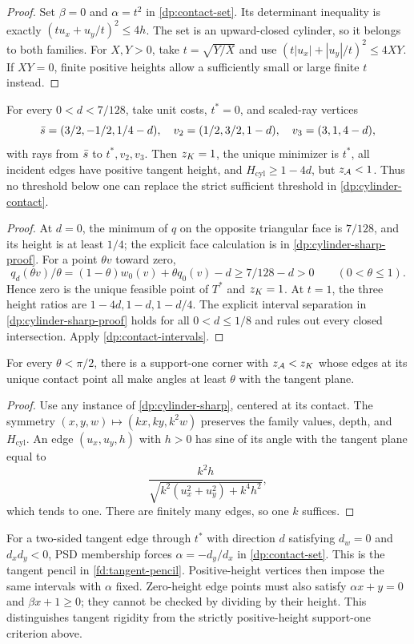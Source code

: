 \begin{proof}
Set $\beta=0$ and $\alpha=t^2$ in \cref{dp:contact-set}.
Its determinant inequality is exactly
$(tu_x+u_y/t)^2\le4h$. The set is an upward-closed cylinder, so it
belongs to both families. For $X,Y>0$, take $t=\sqrt{Y/X}$ and use
$(t|u_x|+|u_y|/t)^2\le4XY$. If $XY=0$, finite positive heights allow
a sufficiently small or large finite $t$ instead.
\end{proof}

\begin{proposition}\label{dp:cylinder-sharp}
For every $0<d<7/128$, take unit costs, $t^*=0$, and scaled-ray vertices
\[
 \bar s=(3/2,-1/2,1/4-d),\quad
 v_2=(1/2,3/2,1-d),\quad v_3=(3,1,4-d),
\]
with rays from $\bar s$ to $t^*,v_2,v_3$. Then $z_K=1$, the unique
minimizer is $t^*$, all incident edges have positive tangent height, and
$H_{\mathrm{cyl}}\ge1-4d$, but $z_{\mathcal A}<1$.
Thus no threshold below one can replace the strict sufficient threshold in
\cref{dp:cylinder-contact}.
\end{proposition}

\begin{proof}
At $d=0$, the minimum of $q$ on the opposite triangular face is $7/128$,
and its height is at least $1/4$; the explicit face calculation is in
\cref{dp:cylinder-sharp-proof}. For a point $\theta v$ toward zero,
\[
 q_d(\theta v)/\theta=(1-\theta)w_0(v)+\theta q_0(v)-d
 \ge7/128-d>0\qquad(0<\theta\le1).
\]
Hence zero is the unique feasible point of $T^*$ and $z_K=1$.
At $t=1$, the three height ratios are $1-4d,1-d,1-d/4$.
The explicit interval separation in \cref{dp:cylinder-sharp-proof}
holds for all $0<d\le1/8$ and rules out every closed intersection.
Apply \cref{dp:contact-intervals}.
\end{proof}

\begin{proposition}\label{dp:angles}
For every $\theta<\pi/2$, there is a support-one corner with $z_{\mathcal A}<z_K$ whose
edges at its unique contact point all make angles at least $\theta$ with
the tangent plane.
\end{proposition}

\begin{proof}
Use any instance of \cref{dp:cylinder-sharp}, centered at its contact.
The symmetry $(x,y,w)\mapsto(kx,ky,k^2w)$ preserves the family values,
depth, and $H_{\mathrm{cyl}}$. An edge $(u_x,u_y,h)$ with $h>0$ has sine
of its angle with the tangent plane equal to
\[
 \frac{k^2h}{\sqrt{k^2(u_x^2+u_y^2)+k^4h^2}},
\]
which tends to one. There are finitely many edges, so one $k$ suffices.
\end{proof}

For a two-sided tangent edge through $t^*$ with direction $d$ satisfying
$d_w=0$ and $d_xd_y<0$, PSD membership forces
$\alpha=-d_y/d_x$ in \cref{dp:contact-set}. This is the tangent pencil
in \cref{fd:tangent-pencil}. Positive-height vertices then impose the
same intervals with $\alpha$ fixed. Zero-height edge points must also
satisfy $\alpha x+y=0$ and $\beta x+1\ge0$; they cannot be checked by
dividing by their height. This distinguishes tangent rigidity from the
strictly positive-height support-one criterion above.
